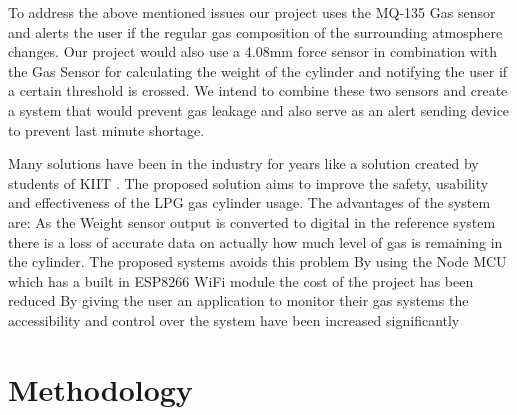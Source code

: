 \documentclass[conference]{IEEEtran}
\begin{document}
To address the above mentioned issues our project
uses the MQ-135 Gas sensor and alerts the user if the
regular gas composition of the surrounding atmosphere
changes. Our project would also use a 4.08mm force
sensor in combination with the Gas Sensor for
calculating the weight of the cylinder and notifying
the user if a certain threshold is crossed.
We intend to combine these two sensors and create a
system that would prevent gas leakage and also serve
as an alert sending device to prevent last minute
shortage.

Many solutions have been in the industry for years like
a solution created by students of KIIT \cite{[7]}.
The proposed solution aims to improve the safety,
usability and effectiveness of the LPG gas cylinder
usage. The advantages of the system are:
As the Weight sensor output is converted to digital
in the reference system there is a loss of accurate
data on actually how much level of gas is remaining
in the cylinder. The proposed systems avoids this
problem By using the Node MCU which has a built in
ESP8266 WiFi module the cost of the project has been
reduced By giving the user an application to monitor
their gas systems the accessibility and control over
the system have been increased significantly

\section{Methodology}
\end{document}
